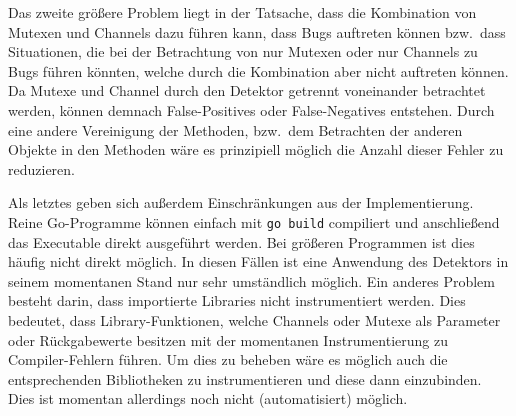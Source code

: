 Das zweite größere Problem liegt in der Tatsache, dass die Kombination 
von Mutexen und Channels dazu führen kann, dass Bugs auftreten können
bzw.~dass Situationen, die bei der Betrachtung von nur Mutexen oder nur 
Channels zu Bugs führen könnten, welche durch die Kombination aber nicht auftreten 
können. Da Mutexe und Channel durch den Detektor getrennt voneinander betrachtet
werden, können demnach False-Positives oder False-Negatives entstehen. Durch eine andere 
Vereinigung der Methoden, bzw.~dem Betrachten der anderen Objekte in den 
Methoden wäre es prinzipiell möglich die Anzahl dieser Fehler zu reduzieren.

Als letztes geben sich außerdem Einschränkungen aus der Implementierung. 
Reine Go-Programme können einfach mit \texttt{go build} compiliert und anschließend 
das Executable direkt ausgeführt werden. Bei größeren Programmen ist dies 
häufig nicht direkt möglich. In diesen Fällen ist eine Anwendung des 
Detektors in seinem momentanen Stand nur sehr umständlich möglich. Ein anderes 
Problem besteht darin, dass importierte Libraries nicht instrumentiert werden.
Dies bedeutet, dass Library-Funktionen, welche Channels oder Mutexe als 
Parameter oder Rückgabewerte besitzen mit der momentanen Instrumentierung
zu Compiler-Fehlern führen. Um dies zu beheben wäre es möglich auch die 
entsprechenden Bibliotheken zu instrumentieren und diese dann einzubinden. 
Dies ist momentan allerdings noch nicht (automatisiert) möglich.